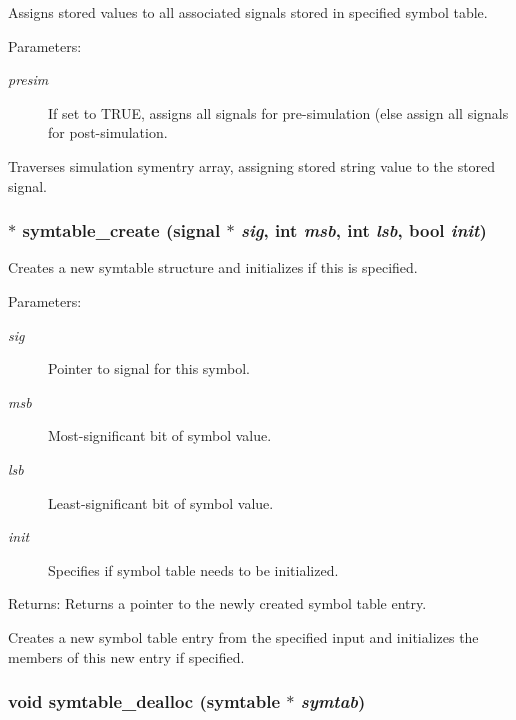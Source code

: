 Assigns stored values to all associated signals stored in specified symbol table. 

\begin{Desc}
\item[Parameters:]
\begin{description}
\item[{\em presim}]If set to TRUE, assigns all signals for pre-simulation (else assign all signals for post-simulation.\end{description}
\end{Desc}
Traverses simulation symentry array, assigning stored string value to the stored signal. 
\subsubsection{$\ast$ symtable\_\-create ({\bf signal} $\ast$ {\em sig}, int {\em msb}, int {\em lsb}, {\bf bool} {\em init})}\label{symtable_8h_a0}


Creates a new symtable structure and initializes if this is specified. 

\begin{Desc}
\item[Parameters:]
\begin{description}
\item[{\em sig}]Pointer to signal for this symbol. \item[{\em msb}]Most-significant bit of symbol value. \item[{\em lsb}]Least-significant bit of symbol value. \item[{\em init}]Specifies if symbol table needs to be initialized.\end{description}
\end{Desc}
\begin{Desc}
\item[Returns:]Returns a pointer to the newly created symbol table entry.\end{Desc}
Creates a new symbol table entry from the specified input and initializes the members of this new entry if specified. 
\subsubsection{\setlength{\rightskip}{0pt plus 5cm}void symtable\_\-dealloc ({\bf symtable} $\ast$ {\em symtab})}\label{symtable_8h_a4}


